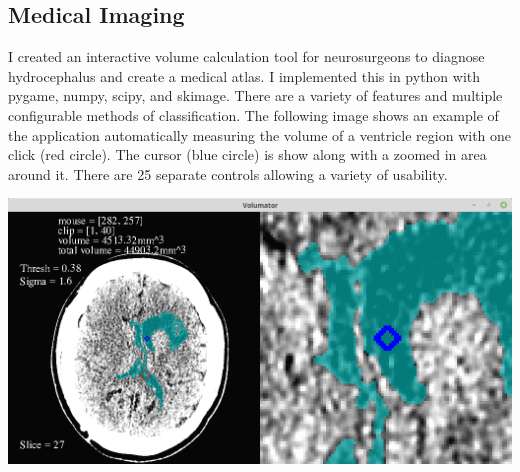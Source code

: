 \documentclass[../r.tex]{subfiles}
\begin{document}
\begin{figure}[ht]\centering
{}
\end{figure}

\subsection{Medical Imaging}
I created an interactive volume calculation tool for neurosurgeons to diagnose hydrocephalus and create a medical atlas.  I implemented this in python with pygame, numpy, scipy, and skimage.  There are a variety of features and multiple configurable methods of classification.  The following image shows an example of the application automatically measuring the volume of a ventricle region with one click (red circle).  The cursor (blue circle) is show along with a zoomed in area around it.  There are 25 separate controls allowing a variety of usability.

\includegraphics[scale=0.3]{../research/volumator.png} 
\end{document}
